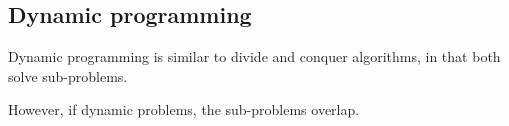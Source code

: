 
\subsection{Dynamic programming}

Dynamic programming is similar to divide and conquer algorithms, in that both solve sub-problems.

However, if dynamic problems, the sub-problems overlap.

